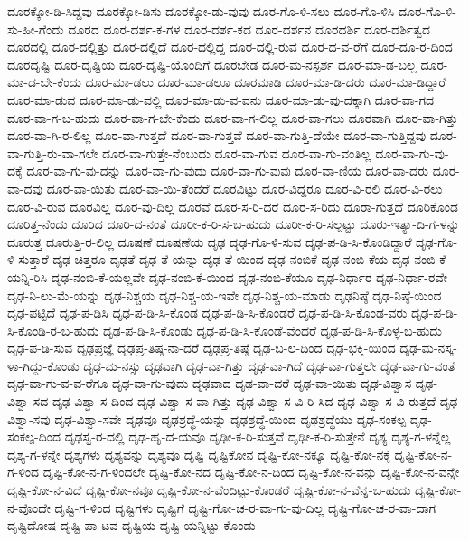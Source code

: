 {ದೂರಕ್ಕೋ-ಡಿ-ಸಿದ್ದವು
ದೂರಕ್ಕೋ-ಡಿಸು
ದೂರಕ್ಕೋ-ಡು-ವುವು
ದೂರ-ಗೊ-ಳಿ-ಸಲು
ದೂರ-ಗೊ-ಳಿಸಿ
ದೂರ-ಗೊ-ಳಿ-ಸು-ಹೀ-ಗೆಂದು
ದೂರದ
ದೂರ-ದರ್ಶ-ಕ-ಗಳ
ದೂರ-ದರ್ಶ-ಕದ
ದೂರ-ದರ್ಶನ
ದೂರದರ್ಶಿ
ದೂರ-ದರ್ಶಿತ್ವದ
ದೂರದಲ್ಲಿ
ದೂರ-ದಲ್ಲಿತ್ತು
ದೂರ-ದಲ್ಲಿದೆ
ದೂರ-ದಲ್ಲಿದ್ದ
ದೂರ-ದಲ್ಲಿ-ರುವ
ದೂರ-ದ-ವ-ರೆಗೆ
ದೂರ-ದೂ-ರ-ದಿಂದ
ದೂರದೃಷ್ಟಿ
ದೂರ-ದೃಷ್ಟಿಯ
ದೂರ-ದೃಷ್ಟಿ-ಯೊಂದಿಗೆ
ದೂರಬೇಡ
ದೂರ-ಮ-ನಸ್ಪರ್ಶ
ದೂರ-ಮಾ-ಡ-ಬಲ್ಲ
ದೂರ-ಮಾ-ಡ-ಬೇ-ಕೆಂದು
ದೂರ-ಮಾ-ಡಲು
ದೂರ-ಮಾ-ಡಲೂ
ದೂರಮಾಡಿ
ದೂರ-ಮಾ-ಡಿ-ದರು
ದೂರ-ಮಾ-ಡಿದ್ದಾರೆ
ದೂರ-ಮಾ-ಡುವ
ದೂರ-ಮಾ-ಡು-ವಲ್ಲಿ
ದೂರ-ಮಾ-ಡು-ವ-ವನು
ದೂರ-ಮಾ-ಡು-ವು-ದಕ್ಕಾಗಿ
ದೂರ-ವಾ-ಗದ
ದೂರ-ವಾ-ಗ-ಬ-ಹುದು
ದೂರ-ವಾ-ಗ-ಬೇ-ಕೆಂದು
ದೂರ-ವಾ-ಗ-ಲಿಲ್ಲ
ದೂರ-ವಾ-ಗಲು
ದೂರವಾಗಿ
ದೂರ-ವಾ-ಗಿತ್ತು
ದೂರ-ವಾ-ಗಿ-ರ-ಲಿಲ್ಲ
ದೂರ-ವಾ-ಗುತ್ತದೆ
ದೂರ-ವಾ-ಗುತ್ತವೆ
ದೂರ-ವಾ-ಗುತ್ತಿ-ದೆಯೇ
ದೂರ-ವಾ-ಗುತ್ತಿದ್ದವು
ದೂರ-ವಾ-ಗುತ್ತಿ-ರು-ವಾ-ಗಲೇ
ದೂರ-ವಾ-ಗುತ್ತೇ-ನೆಂಬುದು
ದೂರ-ವಾ-ಗುವ
ದೂರ-ವಾ-ಗು-ವಂತಿಲ್ಲ
ದೂರ-ವಾ-ಗು-ವು-ದಕ್ಕೆ
ದೂರ-ವಾ-ಗು-ವು-ದನ್ನು
ದೂರ-ವಾ-ಗು-ವುದು
ದೂರ-ವಾ-ಗು-ವುವು
ದೂರ-ವಾ-ಣಿಯ
ದೂರ-ವಾ-ದರು
ದೂರ-ವಾ-ದವು
ದೂರ-ವಾ-ಯಿತು
ದೂರ-ವಾ-ಯಿ-ತೆಂದರೆ
ದೂರವಿಟ್ಟು
ದೂರ-ವಿದ್ದರೂ
ದೂರ-ವಿ-ರಲಿ
ದೂರ-ವಿ-ರಲು
ದೂರ-ವಿ-ರುವ
ದೂರವಿಲ್ಲ
ದೂರ-ವು-ದಿಲ್ಲ
ದೂರವೆ
ದೂರ-ಸ-ರಿ-ದರೆ
ದೂರ-ಸ-ರಿದು
ದೂರಾ-ಗುತ್ತದೆ
ದೂರಿಕೊಂಡ
ದೂರಿತ್ತ-ನೆಂದು
ದೂರಿದ
ದೂರಿ-ದ-ನಂತೆ
ದೂರೀ-ಕ-ರಿ-ಸ-ಬ-ಹುದು
ದೂರೀ-ಕ-ರಿ-ಸಲ್ಪಟ್ಟು
ದೂರು-ಇತ್ಯಾ-ದಿ-ಗ-ಳನ್ನು
ದೂರುತ್ತ
ದೂರುತ್ತಿ-ರ-ಲಿಲ್ಲ
ದೂಷಣೆ
ದೂಷಣೆಯ
ದೃಢ
ದೃಢ-ಗೊ-ಳಿ-ಸುವ
ದೃಢ-ಪ-ಡಿ-ಸಿ-ಕೊಂಡಿದ್ದಾರೆ
ದೃಢ-ಗೊ-ಳಿ-ಸುತ್ತಾರೆ
ದೃಢ-ಚಿತ್ತರೂ
ದೃಢತೆ
ದೃಢ-ತೆ-ಯನ್ನು
ದೃಢ-ತೆ-ಯಿಂದ
ದೃಢ-ನಂಬಿಕೆ
ದೃಢ-ನಂಬಿ-ಕೆಯ
ದೃಢ-ನಂಬಿ-ಕೆ-ಯನ್ನಿ-ರಿಸಿ
ದೃಢ-ನಂಬಿ-ಕೆ-ಯಲ್ಲವೇ
ದೃಢ-ನಂಬಿ-ಕೆ-ಯಿಂದ
ದೃಢ-ನಂಬಿ-ಕೆಯೂ
ದೃಢ-ನಿರ್ಧಾರ
ದೃಢ-ನಿರ್ಧಾ-ರವೇ
ದೃಢ-ನಿ-ಲು-ಮೆ-ಯನ್ನು
ದೃಢ-ನಿಶ್ಚಯ
ದೃಢ-ನಿಶ್ಚ-ಯ-ಇವೇ
ದೃಢ-ನಿಶ್ಚ-ಯ-ಮಾಡು
ದೃಢನಿಷ್ಠೆ
ದೃಢ-ನಿಷ್ಠೆ-ಯಿಂದ
ದೃಢ-ಪಟ್ಟಿದೆ
ದೃಢ-ಪ-ಡಿಸಿ
ದೃಢ-ಪ-ಡಿ-ಸಿ-ಕೊಂಡ
ದೃಢ-ಪ-ಡಿ-ಸಿ-ಕೊಂಡರೆ
ದೃಢ-ಪ-ಡಿ-ಸಿ-ಕೊಂಡ-ವರು
ದೃಢ-ಪ-ಡಿ-ಸಿ-ಕೊಂಡಿ-ರ-ಬ-ಹುದು
ದೃಢ-ಪ-ಡಿ-ಸಿ-ಕೊಂಡು
ದೃಢ-ಪ-ಡಿ-ಸಿ-ಕೊಂಡೆ-ವೆಂದರೆ
ದೃಢ-ಪ-ಡಿ-ಸಿ-ಕೊಳ್ಳ-ಬ-ಹುದು
ದೃಢ-ಪ-ಡಿ-ಸುವ
ದೃಢಪ್ರಜ್ಞೆ
ದೃಢಪ್ರ-ತಿಷ್ಠ-ನಾ-ದರೆ
ದೃಢಪ್ರ-ತಿಷ್ಠೆ
ದೃಢ-ಬ-ಲ-ದಿಂದ
ದೃಢ-ಭಕ್ತಿ-ಯಿಂದ
ದೃಢ-ಮ-ನಸ್ಕ-ಳಾ-ಗಿದ್ದು-ಕೊಂಡು
ದೃಢ-ಮ-ನಸ್ಸು
ದೃಢವಾಗಿ
ದೃಢ-ವಾ-ಗಿತ್ತು
ದೃಢ-ವಾ-ಗಿದೆ
ದೃಢ-ವಾ-ಗುತ್ತಲೇ
ದೃಢ-ವಾ-ಗು-ವಂತೆ
ದೃಢ-ವಾ-ಗು-ವ-ವ-ರೆಗೂ
ದೃಢ-ವಾ-ಗು-ವುದು
ದೃಢವಾದ
ದೃಢ-ವಾ-ದರೆ
ದೃಢ-ವಾ-ಯಿತು
ದೃಢ-ವಿಶ್ವಾಸ
ದೃಢ-ವಿಶ್ವಾ-ಸದ
ದೃಢ-ವಿಶ್ವಾ-ಸ-ದಿಂದ
ದೃಢ-ವಿಶ್ವಾ-ಸ-ವಾ-ಗಿತ್ತು
ದೃಢ-ವಿಶ್ವಾ-ಸ-ವಿ-ರಿ-ಸಿದ
ದೃಢ-ವಿಶ್ವಾ-ಸ-ವಿ-ರುತ್ತದೆ
ದೃಢ-ವಿಶ್ವಾ-ಸವು
ದೃಢ-ವಿಶ್ವಾ-ಸವೇ
ದೃಢವೂ
ದೃಢಶ್ರದ್ಧೆ-ಯನ್ನು
ದೃಢಶ್ರದ್ಧೆ-ಯಿಂದ
ದೃಢಶ್ರದ್ಧೆಯು
ದೃಢ-ಸಂಕಲ್ಪ
ದೃಢ-ಸಂಕಲ್ಪ-ದಿಂದ
ದೃಢಸ್ವ-ರ-ದಲ್ಲಿ
ದೃಢ-ಹೃ-ದ-ಯವೂ
ದೃಢೀ-ಕ-ರಿ-ಸುತ್ತವೆ
ದೃಢೀ-ಕ-ರಿ-ಸುತ್ತೇನೆ
ದೃಶ್ಯ
ದೃಶ್ಯ-ಗ-ಳನ್ನೆಲ್ಲ
ದೃಶ್ಯ-ಗ-ಳನ್ನೇ
ದೃಶ್ಯಗಳು
ದೃಶ್ಯವನ್ನು
ದೃಶ್ಯವೂ
ದೃಷ್ಟಿ
ದೃಷ್ಟಿಕೋನ
ದೃಷ್ಟಿ-ಕೋ-ನಕ್ಕೂ
ದೃಷ್ಟಿ-ಕೋ-ನಕ್ಕೆ
ದೃಷ್ಟಿ-ಕೋ-ನ-ಗ-ಳಿಂದ
ದೃಷ್ಟಿ-ಕೋ-ನ-ಗ-ಳಿಂದಲೇ
ದೃಷ್ಟಿ-ಕೋ-ನದ
ದೃಷ್ಟಿ-ಕೋ-ನ-ದಿಂದ
ದೃಷ್ಟಿ-ಕೋ-ನ-ವನ್ನು
ದೃಷ್ಟಿ-ಕೋ-ನ-ವನ್ನೇ
ದೃಷ್ಟಿ-ಕೋ-ನ-ವಿದೆ
ದೃಷ್ಟಿ-ಕೋ-ನವೂ
ದೃಷ್ಟಿ-ಕೋ-ನ-ವೆಂದಿಟ್ಟು-ಕೊಂಡರೆ
ದೃಷ್ಟಿ-ಕೋ-ನ-ವೆನ್ನ-ಬ-ಹುದು
ದೃಷ್ಟಿ-ಕೋ-ನ-ವೊಂದೇ
ದೃಷ್ಟಿ-ಗ-ಳಿಂದ
ದೃಷ್ಟಿಗಳು
ದೃಷ್ಟಿಗೆ
ದೃಷ್ಟಿ-ಗೋ-ಚ-ರ-ವಾ-ಗು-ವು-ದಿಲ್ಲ
ದೃಷ್ಟಿ-ಗೋ-ಚ-ರ-ವಾ-ದಾಗ
ದೃಷ್ಟಿದೋಷ
ದೃಷ್ಟಿ-ಪಾ-ಟವ
ದೃಷ್ಟಿಯ
ದೃಷ್ಟಿ-ಯನ್ನಿಟ್ಟು-ಕೊಂಡು
}
